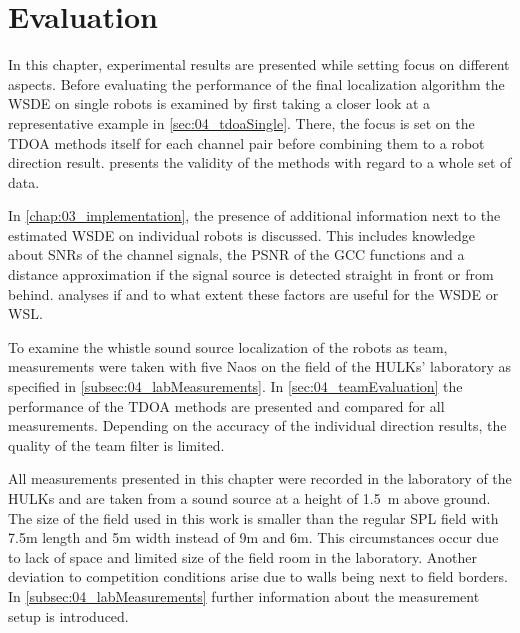 \chapter{Evaluation}


In this chapter, experimental results are presented while setting
focus on different aspects.
Before evaluating the performance of the final localization algorithm the
\ac{WSDE} on single robots is examined by first taking a closer look
at a representative example in \cref{sec:04_tdoaSingle}.
There, the focus is set on the \ac{TDOA} methods itself for each channel pair
before combining them to a robot direction result.
 presents the validity of the methods with
regard to a whole set of data.

In \cref{chap:03_implementation}, the presence of additional
information next to the estimated \ac{WSDE} on individual robots
is discussed.
This includes knowledge about \acp{SNR} of the channel signals, the \ac{PSNR}
of the \ac{GCC} functions and a distance approximation if the signal source
is detected straight in front or from behind.
 analyses if and to
what extent these factors are useful for the \ac{WSDE} or \ac{WSL}.

To examine the whistle sound source localization of the robots as team,
measurements were taken with five Naos on the field of the HULKs' laboratory
as specified in \cref{subsec:04_labMeasurements}.
In \cref{sec:04_teamEvaluation} the performance of the \ac{TDOA} methods are presented
and compared for all measurements.
Depending on the accuracy of the individual direction results, the quality
of the team filter is limited.

All measurements presented in this chapter were recorded in the
laboratory of the HULKs and are taken from a sound source at a height of
\SI{1.5}{\meter} above ground.
The size of the field used in this work is smaller than the regular \ac{SPL}
field with 7.5\si{m} length and 5\si{m} width instead of 9\si{\meter} and 6\si{\meter}.
This circumstances occur due to lack of space and limited size of the
field room in the laboratory.
Another deviation to competition conditions arise due to walls being next to field borders.
In \cref{subsec:04_labMeasurements} further information about the measurement setup
is introduced.







